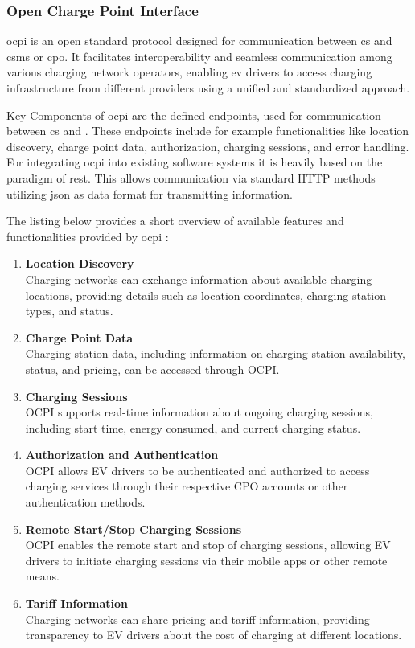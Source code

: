 \subsubsection{Open Charge Point Interface}
\label{ch:Introduction:sec:Electric Mobility:ssec:Communication protocol:sssec:Open Charge Point Interface}
\acrfull{ocpi} is an open standard protocol designed for communication between \acrshort{cs} and \acrshort{csms} or \acrshort{cpo}. It facilitates interoperability and seamless communication among various charging network operators, enabling \acrshort{ev} drivers to access charging infrastructure from different providers using a unified and standardized approach. 

Key Components of \acrshort{ocpi} are the defined endpoints, used for communication between \acrshort{cs} and . These endpoints include for example functionalities like location discovery, charge point data, authorization, charging sessions, and error handling. For integrating \acrshort{ocpi} into existing software systems it is heavily based on the paradigm of \acrfull{rest}. This allows communication via standard HTTP methods utilizing \acrfull{json} as data format for transmitting information. 

The listing below provides a short overview of available features and functionalities provided by \acrshort{ocpi} \cite{noauthor_ocpiocpi_2023}:

\begin{enumerate}
    \item \textbf{Location Discovery}\\Charging networks can exchange information about available charging locations, providing details such as location coordinates, charging station types, and status.
    \item \textbf{Charge Point Data}\\Charging station data, including information on charging station availability, status, and pricing, can be accessed through OCPI.
    \item \textbf{Charging Sessions}\\OCPI supports real-time information about ongoing charging sessions, including start time, energy consumed, and current charging status.
    \item \textbf{Authorization and Authentication}\\OCPI allows EV drivers to be authenticated and authorized to access charging services through their respective CPO accounts or other authentication methods.
    \item \textbf{Remote Start/Stop Charging Sessions}\\OCPI enables the remote start and stop of charging sessions, allowing EV drivers to initiate charging sessions via their mobile apps or other remote means.
    \item \textbf{Tariff Information}\\Charging networks can share pricing and tariff information, providing transparency to EV drivers about the cost of charging at different locations.
\end{enumerate}

